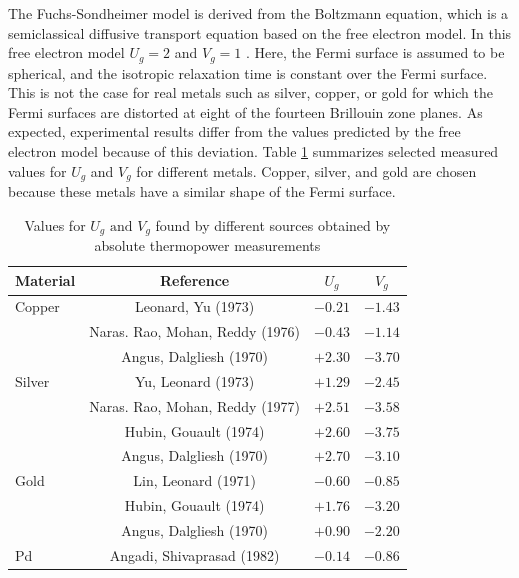 \documentclass[journal]{IEEEtran}
\newcommand{\mathrmm}[1]{{#1}}
\begin{document}
The Fuchs-Sondheimer model is derived from the Boltzmann equation, which is a semiclassical diffusive transport equation based on the free electron model.
In this free electron model $U_{\mathrmm{g}}=2$ and $V_{\mathrmm{g}}=1$
\cite{leonard1973thermoelectric}. Here, the Fermi surface is assumed to be
spherical, and the isotropic relaxation time is constant over the Fermi
surface. This is not the case for real metals such as silver, copper, or gold for
which the Fermi surfaces are distorted at eight of the fourteen Brillouin
zone planes. As expected, experimental results differ from the values
predicted by the free electron model because of this deviation. Table
\ref{tab:UgVgValues} summarizes selected measured values for $U_{\mathrmm{g}}$ and $V_{\mathrmm{g}}$ for different metals. Copper, silver, and gold are chosen because these metals have a similar shape of the Fermi surface.
%
\begin{table}[h]
\caption{Values for $U_{\mathrmm{g}}\text{ and }V_{\mathrmm{g}}$ found by
different sources obtained by absolute thermopower measurements}%
\label{tab:UgVgValues}%
\begin{tabular}
[c]{|l||c|c|c|}\hline
{\scriptsize Material} & Reference & $U_{\mathrmm{g}}$ & $V_{\mathrmm{g}}$\\\hline
Copper & \cite{leonard1973thermoelectric} Leonard, Yu (1973) & $-0.21$ &
$-1.43 $\\
& \cite{rao1976electrical} Naras. Rao, Mohan, Reddy (1976) & $-0.43$ & $-1.14
$\\
& \cite{angus1970thermopower} Angus, Dalgliesh (1970) & $+2.30$ &
$-3.70$\\\hline
Silver & \cite{yu1973thermoelectric} Yu, Leonard (1973) & $+1.29$ & $-2.45$\\
& \cite{rao1977size} Naras. Rao, Mohan, Reddy (1977) & $+2.51$ & $-3.58$\\
& \cite{hubin1974resistivity} Hubin, Gouault (1974) & $+2.60$ & $-3.75$\\
& \cite{angus1970thermopower} Angus, Dalgliesh (1970) & $+2.70$ &
$-3.10$\\\hline
Gold & \cite{lin1971thermoelectric} Lin, Leonard (1971) & $-0.60 $ & $-0.85$\\
& \cite{hubin1974resistivity} Hubin, Gouault (1974) & $+1.76$ & $-3.20$\\
& \cite{angus1970thermopower} Angus, Dalgliesh (1970) & $+0.90$ &
$-2.20$\\\hline
Pd & \cite{angadi1982thermoelectric} Angadi, Shivaprasad (1982) &
$-0.14$ & $-0.86$\\\hline
\end{tabular}
\end{table}
\end{document}
